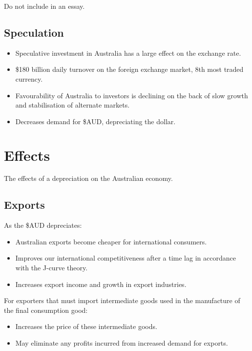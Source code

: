 \documentclass[a4paper,11pt]{article}
\begin{document}
Do not include in an essay.


\subsection{Speculation}

\begin{itemize}
\item Speculative investment in Australia has a large effect on the exchange
	rate.
\item \$180 billion daily turnover on the foreign exchange market, 8th most
	traded currency.
\item Favourability of Australia to investors is declining on the back of slow
	growth and stabilisation of alternate markets.
\item Decreases demand for \$AUD, depreciating the dollar.
\end{itemize}




\section{Effects}

The effects of a depreciation on the Australian economy.


\subsection{Exports}

As the \$AUD depreciates:

\begin{itemize}
\item Australian exports become cheaper for international consumers.
\item Improves our international competitiveness after a time lag in accordance
	with the J-curve theory.
\item Increases export income and growth in export industries.
\end{itemize}

For exporters that must import intermediate goods used in the manufacture of
the final consumption good:

\begin{itemize}
\item Increases the price of these intermediate goods.
\item May eliminate any profits incurred from increased demand for exports.
\end{itemize}
\end{document}
